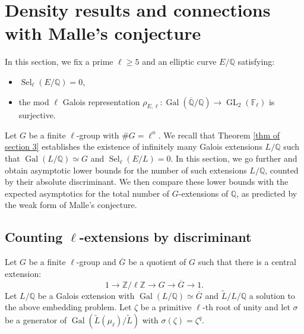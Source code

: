 \documentclass[11pt,reqno]{amsart}
\newcommand{\Z}{\mathbb{Z}}
\newcommand{\Q}{\mathbb{Q}}
\newcommand{\F}{\mathbb{F}}
\newcommand{\op}[1]{\operatorname{#1}}
\numberwithin{equation}{section}
\begin{document}
\section{Density results and connections with Malle's conjecture}\label{s 4}
\par In this section, we fix a prime \( \ell \geq 5 \) and an elliptic curve \( E/\Q \) satisfying:
\begin{itemize}
    \item \( \operatorname{Sel}_\ell(E/\Q) = 0 \),
    \item the mod \( \ell \) Galois representation \( \rho_{E,\ell} : \operatorname{Gal}(\overline{\Q}/\Q) \to \operatorname{GL}_2(\F_\ell) \) is surjective.
\end{itemize}
Let $G$ be a finite $\ell$-group with $\# G=\ell^n$. We recall that Theorem \ref{thm of section 3} establishes the existence of infinitely many Galois extensions \( L/\Q \) such that \( \operatorname{Gal}(L/\Q) \simeq G \) and \( \operatorname{Sel}_\ell(E/L) = 0 \). In this section, we go further and obtain asymptotic lower bounds for the number of such extensions \( L/\Q \), counted by their absolute discriminant. We then compare these lower bounds with the expected asymptotics for the total number of \( G \)-extensions of \( \Q \), as predicted by the weak form of Malle's conjecture.


\subsection{Counting $\ell$-extensions by discriminant} Let $G$ be a finite $\ell$-group and $\overline{G}$ be a quotient of $G$ such that there is a central extension:
\begin{equation}\label{embedding problem section 4}1\rightarrow \Z/\ell \Z \rightarrow G\rightarrow \overline{G}\rightarrow 1.\end{equation} Let $L/\Q$ be a Galois extension with $\op{Gal}(L/\Q)\simeq \overline{G}$ and $\widetilde{L}/L/\Q$ a solution to the above embedding problem. Let $\zeta$ be a primitive $\ell$-th root of unity and let $\sigma$ be a generator of $\op{Gal}(\widetilde{L}(\mu_\ell)/\widetilde{L})$ with $\sigma(\zeta)=\zeta^q$.
\end{document}
